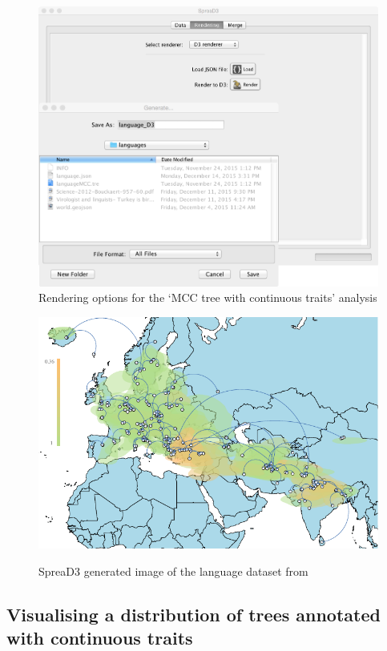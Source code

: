 \documentclass[english]{paper}
\begin{document}
\begin{figure}[!H]
\centering
\includegraphics[width=1\textwidth]{./figures/Fig4_continu_render} 
\caption{Rendering options for the `MCC tree with continuous traits' analysis}
\label{fig:renderMCCcont}
\end{figure}

\begin{figure}[!H]
\centering
\includegraphics[width=1\textwidth]{./figures/Fig_language.pdf} 
\label{fig:imageMCCcont}
\caption{SpreaD3 generated image of the language dataset from \citet{Bouckaert:2012aa}}
\end{figure}


\subsection{Visualising a distribution of trees annotated with continuous traits}
\label{contTreeDistr}
% 
\end{document}
